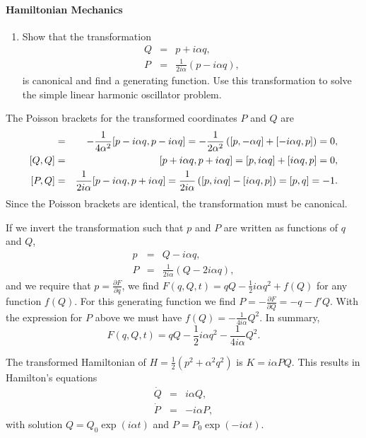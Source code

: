 \documentclass[letterpaper,11pt]{article}
\begin{document}
\paragraph*{Hamiltonian Mechanics}
\begin{enumerate}[resume]
 \item Show that the transformation
 \begin{eqnarray*}
  Q & = & p + i \alpha q, \\
  P & = & \frac{1}{2i\alpha}(p-i\alpha q),
 \end{eqnarray*}
 is canonical and find a generating function.  Use this transformation to solve the simple linear harmonic oscillator problem.
\end{enumerate}

The Poisson brackets for the transformed coordinates $P$ and $Q$ are
\begin{eqnarray*}
 [P,P] & = & -\frac{1}{4\alpha^2} [p-i\alpha q,p-i\alpha q] = -\frac{1}{2\alpha^2} \left( [p,-\alpha q] + [-i\alpha q,p] \right) = 0, \\ \null
 [Q,Q] & = & [p+i\alpha q,p+i\alpha q] = [p,i\alpha q] + [i\alpha q,p] = 0, \\ \null
 [P,Q] & = & \frac{1}{2i\alpha} [p-i\alpha q,p+i\alpha q] = \frac{1}{2i\alpha} \left( [p,i\alpha q] - [i\alpha q,p] \right) = [p,q] = -1.
\end{eqnarray*}
Since the Poisson brackets are identical, the transformation must be canonical.

If we invert the transformation such that $p$ and $P$ are written as functions of $q$ and $Q$,
\begin{eqnarray*}
 p & = & Q-i\alpha q, \\
 P & = & \frac{1}{2i\alpha} (Q-2i\alpha q),
\end{eqnarray*}
and we require that $p = \frac{\partial F}{\partial q}$, we find $F(q,Q,t) = qQ - \frac{1}{2} i\alpha q^2 + f(Q)$ for any function $f(Q)$.  For this generating function we find $P = -\frac{\partial F}{\partial Q} = -q - f'{Q}$.  With the expression for $P$ above we must have $f(Q) = -\frac{1}{4i\alpha} Q^2$.  In summary,
\begin{equation*}
 F(q,Q,t) = qQ - \frac{1}{2} i\alpha q^2 - \frac{1}{4i\alpha} Q^2.
\end{equation*}

The transformed Hamiltonian of $H = \frac{1}{2} \left( p^2 + \alpha^2 q^2 \right)$ is $K = i\alpha PQ$.  This results in Hamilton's equations
\begin{eqnarray*}
 \dot{Q} & = & i\alpha Q, \\
 \dot{P} & = & -i\alpha P,
\end{eqnarray*}
with solution $Q = Q_0 \exp (i\alpha t)$ and $P = P_0 \exp (-i\alpha t)$.
\end{document}
